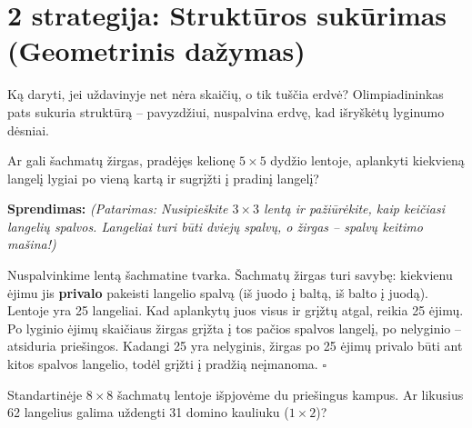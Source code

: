 \documentclass[11pt,a4paper]{scrartcl}
\newenvironment{solution}
    {\begin{list}{}{\setlength{\leftmargin}{10pt}\setlength{\rightmargin}{10pt}}\item[]}
    {\end{list}}
\begin{document}
\section{2 strategija: Struktūros sukūrimas (Geometrinis dažymas)}

Ką daryti, jei uždavinyje net nėra skaičių, o tik tuščia erdvė? Olimpiadininkas pats sukuria struktūrą – pavyzdžiui, nuspalvina erdvę, kad išryškėtų lyginumo dėsniai.

\begin{example}
Ar gali šachmatų žirgas, pradėjęs kelionę $5 \times 5$ dydžio lentoje, aplankyti kiekvieną langelį lygiai po vieną kartą ir sugrįžti į pradinį langelį?
\end{example}

\begin{minipage}{0.6\textwidth}
\begin{solution}
\textbf{Sprendimas:}
\textit{(Patarimas: Nusipieškite $3 \times 3$ lentą ir pažiūrėkite, kaip keičiasi langelių spalvos. Langeliai turi būti dviejų spalvų, o žirgas – spalvų keitimo mašina!)}

Nuspalvinkime lentą šachmatine tvarka. Šachmatų žirgas turi savybę: kiekvienu ėjimu jis \textbf{privalo} pakeisti langelio spalvą (iš juodo į baltą, iš balto į juodą).
Lentoje yra 25 langeliai. Kad aplankytų juos visus ir grįžtų atgal, reikia 25 ėjimų. 
Po lyginio ėjimų skaičiaus žirgas grįžta į tos pačios spalvos langelį, po nelyginio – atsiduria priešingos. Kadangi 25 yra nelyginis, žirgas po 25 ėjimų privalo būti ant kitos spalvos langelio, todėl grįžti į pradžią neįmanoma. \hfill $\square$
\end{solution}
\end{minipage}
\hfill
\begin{minipage}{0.35\textwidth}
\centering
{}
\end{minipage}

\vspace{0.5cm}

\begin{example}
Standartinėje $8 \times 8$ šachmatų lentoje išpjovėme du priešingus kampus. Ar likusius 62 langelius galima uždengti 31 domino kauliuku ($1 \times 2$)?
\end{example}
\end{document}
